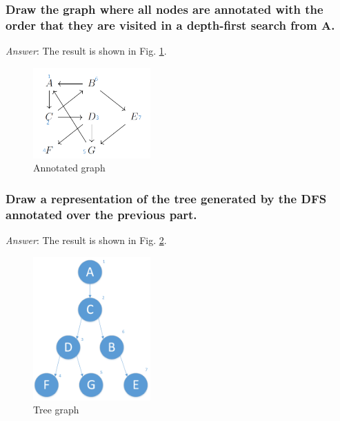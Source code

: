 \documentclass[11pt]{article}
\begin{document}
\subsubsection{Draw the graph where all nodes are annotated with the order that they are visited in a \textbf{depth-first} search from A.}
\noindent \emph{Answer}: The result is shown in Fig. \ref{fig:fig2}.
	\begin{figure}[h]
		\centering
		\includegraphics[width=0.4\textwidth]{Figure/Fig3.png}
		\caption{Annotated graph}
		\label{fig:fig2}
	\end{figure}
\subsubsection{Draw a representation of the tree generated by the DFS annotated over the previous part.}
\noindent \emph{Answer}: The result is shown in Fig. \ref{fig:fig3}.
	\begin{figure}[h]
		\centering
		\includegraphics[width=0.4\textwidth]{Figure/Fig2.png}
		\caption{Tree graph}
		\label{fig:fig3}
	\end{figure}
\end{document}
